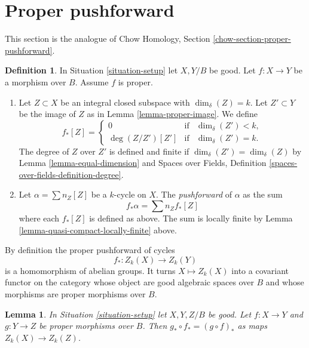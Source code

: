 \documentclass{stacks-project}
\theoremstyle{plain}
\newtheorem{lemma}[subsection]{Lemma}
\theoremstyle{definition}
\newtheorem{definition}[subsection]{Definition}
\theoremstyle{remark}
\numberwithin{equation}{subsection}
\begin{document}
\section{Proper pushforward}
\label{section-proper-pushforward}

\noindent
This section is the analogue of
Chow Homology, Section \ref{chow-section-proper-pushforward}.

\begin{definition}
\label{definition-proper-pushforward}
In Situation \ref{situation-setup} let $X, Y/B$ be good.
Let $f : X \to Y$ be a morphism over $B$.
Assume $f$ is proper.
\begin{enumerate}
\item Let $Z \subset X$ be an integral closed subspace
with $\dim_\delta(Z) = k$. Let $Z' \subset Y$ be the
image of $Z$ as in Lemma \ref{lemma-proper-image}.
We define
$$
f_*[Z] =
\left\{
\begin{matrix}
0 & \text{if} & \dim_\delta(Z')< k, \\
\deg(Z/Z') [Z'] & \text{if} & \dim_\delta(Z') = k.
\end{matrix}
\right.
$$
The degree of $Z$ over $Z'$ is defined and finite if
$\dim_\delta(Z') = \dim_\delta(Z)$ by Lemma \ref{lemma-equal-dimension} and
Spaces over Fields, Definition \ref{spaces-over-fields-definition-degree}.
\item Let $\alpha = \sum n_Z [Z]$ be a $k$-cycle on $X$. The
{\it pushforward} of $\alpha$ as the sum
$$
f_* \alpha = \sum n_Z f_*[Z]
$$
where each $f_*[Z]$ is defined as above. The sum is locally finite
by Lemma \ref{lemma-quasi-compact-locally-finite} above.
\end{enumerate}
\end{definition}

\noindent
By definition the proper pushforward of cycles
$$
f_* : Z_k(X) \longrightarrow Z_k(Y)
$$
is a homomorphism of abelian groups. It turns $X \mapsto Z_k(X)$
into a covariant functor on the category whose object are good
algebraic spaces over $B$ and whose morphisms are proper morphisms
over $B$.

\begin{lemma}
\label{lemma-compose-pushforward}
In Situation \ref{situation-setup} let $X, Y, Z/B$ be good.
Let $f : X \to Y$ and $g : Y \to Z$ be proper morphisms over $B$.
Then $g_* \circ f_* = (g \circ f)_*$ as maps $Z_k(X) \to Z_k(Z)$.
\end{lemma}
\end{document}
